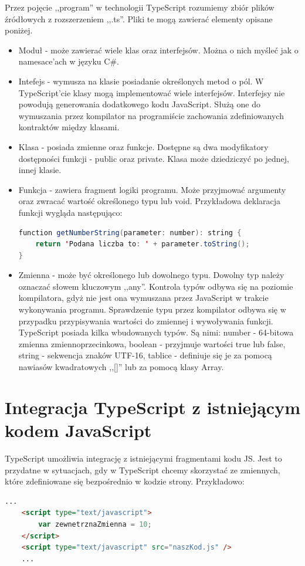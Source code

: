 Przez pojęcie ,,program'' w technologii TypeScript rozumiemy zbiór plików źródłowych z rozszerzeniem ,,.ts''. Pliki te mogą zawierać elementy opisane poniżej.
\begin{itemize}
\item Moduł - może zawierać wiele klas oraz interfejsów. Można o nich myśleć jak o namesace'ach w języku C\#.
\item Intefejs - wymusza na klasie posiadanie określonych metod o pól. W TypeScript'cie klasy mogą implementować wiele interfejsów. Interfejsy nie powodują generowania dodatkowego kodu JavaScript. Służą one do wymuszania przez kompilator na programiście zachowania zdefiniowanych kontraktów między klasami.
\item Klasa - posiada zmienne oraz funkcje. Dostępne są dwa modyfikatory dostępności funkcji - public oraz private. Klasa może dziedziczyć po jednej, innej klasie.
\item Funkcja - zawiera fragment logiki programu. Może przyjmować argumenty oraz zwracać wartość określonego typu lub void. Przykładowa deklaracja funkcji wygląda następująco:
\begin{lstlisting}[language=Java]
function getNumberString(parameter: number): string {
	return 'Podana liczba to: ' + parameter.toString();
}
\end{lstlisting}
\item Zmienna - może być określonego lub dowolnego typu. Dowolny typ należy oznaczać słowem kluczowym ,,any''. Kontrola typów odbywa się na poziomie kompilatora, gdyż nie jest ona wymuszana przez JavaScript w trakcie wykonywania programu. Sprawdzenie typu przez kompilator odbywa się w przypadku przypisywania wartości do zmiennej i wywoływania funkcji. TypeScript posiada kilka wbudowanych typów. Są nimi:
\subitem number - 64-bitowa zmienna zmiennoprzecinkowa,
\subitem boolean - przyjmuje wartości true lub false,
\subitem string - sekwencja znaków UTF-16,
\subitem tablice - definiuje się je za pomocą nawiasów kwadratowych ,,[]'' lub za pomocą klasy Array.
\end{itemize}

\section{Integracja TypeScript z istniejącym kodem JavaScript}
TypeScript umożliwia integrację z istniejącymi fragmentami kodu JS. Jest to przydatne w sytuacjach, gdy w TypeScript chcemy skorzystać ze zmiennych, które zdefiniowane się bezpośrednio w kodzie strony. Przykładowo:
\begin{lstlisting}[language=HTML]
	...
	<script type="text/javascript">
		var zewnetrznaZmienna = 10;
	</script>
	<script type="text/javascript" src="naszKod.js" />
	...
\end{lstlisting}


